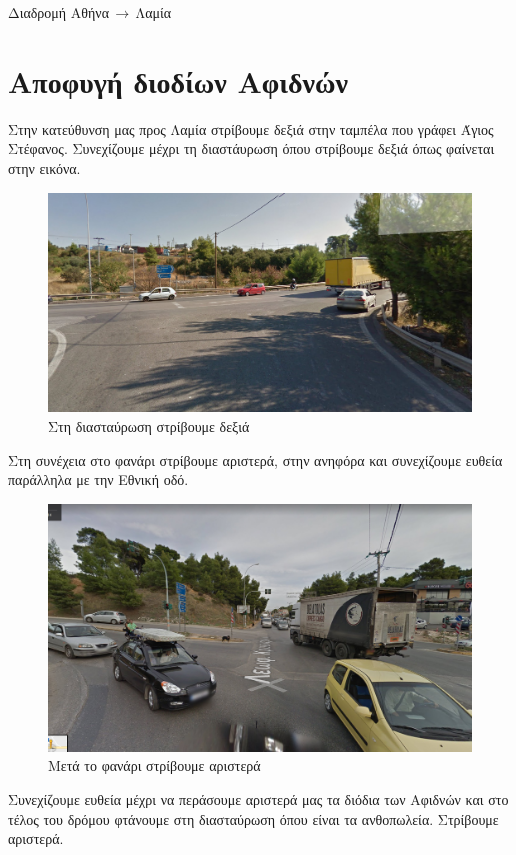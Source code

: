 \begin{center}
\begin{huge}
Διαδρομή Αθήνα$\,\to\,$Λαμία
\end{huge}
\section*{Αποφυγή διοδίων Αφιδνών}
\end{center}
Στην κατεύθυνση μας προς Λαμία στρίβουμε δεξιά στην ταμπέλα που γράφει Άγιος Στέφανος. Συνεχίζουμε μέχρι τη διαστάυρωση όπου στρίβουμε δεξιά όπως φαίνεται στην εικόνα.

\begin{figure}[hbp!]
	\centering
		\includegraphics[width=\textwidth]{images/athina-lamia/astefanos/astefanos1.PNG}
			\caption{Στη διασταύρωση στρίβουμε δεξιά}
\end{figure}

Στη συνέχεια στο φανάρι στρίβουμε αριστερά, στην ανηφόρα και συνεχίζουμε ευθεία παράλληλα με την Εθνική οδό.

\begin{figure}[hbp!]
	\centering
		\includegraphics[width=\textwidth]{images/athina-lamia/astefanos/astefanos2.PNG}
			\caption{Μετά το φανάρι στρίβουμε αριστερά}
\end{figure}
\break
Συνεχίζουμε ευθεία μέχρι να περάσουμε αριστερά μας τα διόδια των Αφιδνών και στο τέλος του δρόμου φτάνουμε στη διασταύρωση όπου είναι τα ανθοπωλεία. Στρίβουμε αριστερά.

